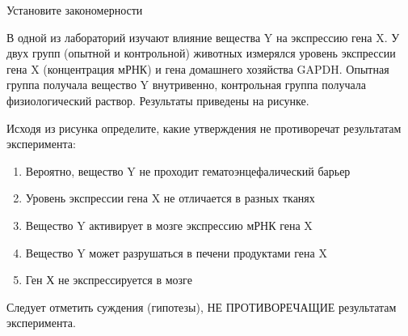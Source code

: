 
Установите закономерности 

В одной из лабораторий изучают влияние вещества Y на экспрессию гена X. У двух групп (опытной и
контрольной) животных измерялся уровень экспрессии гена X (концентрация мРНК) и гена домашнего
хозяйства GAPDH. Опытная группа получала вещество Y внутривенно, контрольная группа
получала физиологический раствор. Результаты приведены на рисунке.


Исходя из рисунка определите, какие утверждения не противоречат результатам эксперимента:

\begin{enumerate}
    \item Вероятно, вещество Y не проходит гематоэнцефалический барьер
    \item Уровень экспрессии гена X не отличается в разных тканях
    \item Вещество Y активирует в мозге экспрессию мРНК гена X
    \item Вещество Y может разрушаться в печени продуктами гена X
    \item Ген Х не экспрессируется в мозге
\end{enumerate}

\explanationSection

Следует отметить суждения (гипотезы), НЕ ПРОТИВОРЕЧАЩИЕ результатам эксперимента.

